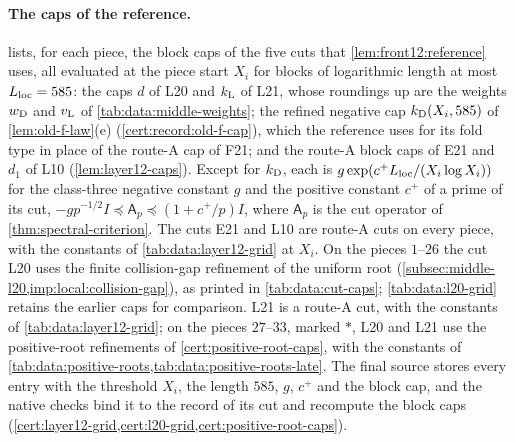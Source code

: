 \paragraph{The caps of the reference.}
 lists, for each piece, the block caps of the five cuts
that \cref{lem:front12:reference} uses, all evaluated at the piece start $X_i$
for blocks of logarithmic length at most $L_{\rm loc}=585$: the caps $d$ of L20
and $k_{\rm L}$ of L21, whose roundings up are the weights $w_{\rm D}$ and
$v_{\rm L}$ of \cref{tab:data:middle-weights}; the refined negative cap
$k_{\rm D}(X_i,585)$ of \cref{lem:old-f-law}(e) (\cref{cert:record:old-f-cap}),
which the reference uses for its fold type in place of the route-A cap of F21;
and the route-A block caps of E21 and $d_1$ of L10 (\cref{lem:layer12-caps}).
Except for $k_{\rm D}$, each is $g\exp(c^+L_{\rm loc}/(X_i\log X_i))$ for the
class-three negative constant $g$ and the positive constant $c^+$ of a prime of
its cut, $-gp^{-1/2}I\preceq\mathsf A_p\preceq(1+c^+/p)I$, where
$\mathsf A_p$ is the cut operator of
\cref{thm:spectral-criterion}. The cuts E21 and L10 are route-A
cuts on every piece, with the constants of \cref{tab:data:layer12-grid} at $X_i$.
On the pieces $1$--$26$ the cut L20 uses the finite collision-gap refinement
of the uniform root (\cref{subsec:middle-l20,imp:local:collision-gap}), as
printed in \cref{tab:data:cut-caps}; \cref{tab:data:l20-grid} retains the earlier
caps for comparison. L21 is a route-A cut, with the constants of
\cref{tab:data:layer12-grid}; on the pieces $27$--$33$, marked $\ast$, L20 and L21
use the positive-root refinements of \cref{cert:positive-root-caps}, with
the constants of \cref{tab:data:positive-roots,tab:data:positive-roots-late}. The final source stores every entry with the
threshold $X_i$, the length $585$, $g$, $c^+$ and the block cap, and the native
checks bind it to the record of its cut and recompute the block caps
(\cref{cert:layer12-grid,cert:l20-grid,cert:positive-root-caps}).

